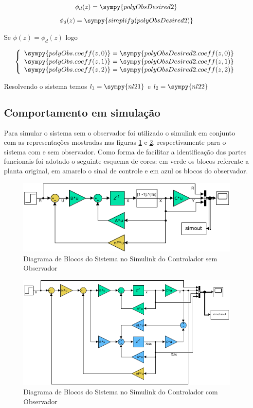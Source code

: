 \documentclass[a4paper,11pt]{article}
\begin{document}
$$\phi_d(z) = \sympy{polyObsDesired2}$$
$$\phi_d(z) = \sympy{simplify(polyObsDesired2)}$$

Se $\phi(z) = \phi_d(z)$ logo

$$
\left\{
    \begin{array}{l}
        \sympy{polyObs.coeff(z,0)} = \sympy{polyObsDesired2.coeff(z,0)}\\
        \sympy{polyObs.coeff(z,1)} = \sympy{polyObsDesired2.coeff(z,1)}\\
        \sympy{polyObs.coeff(z,2)} = \sympy{polyObsDesired2.coeff(z,2)}\\
    \end{array}
\right.
$$

Resolvendo o sistema temos $l_1 = \sympy{nl21} $ e $l_2 = \sympy{nl22}$

\subsection{Comportamento em simulação}

Para simular o sistema sem o observador foi utilizado o simulink em conjunto com as representações mostradas nas figuras \ref{fig:e6-ss-model} e \ref{fig:e6-ssobs-model}, respectivamente para o sistema com e sem observador. Como forma de facilitar a identificação das partes funcionais foi adotado o seguinte esquema de cores: em verde os blocos referente a planta original, em amarelo o sinal de controle e em azul os blocos do observador.

\begin{figure}[H]
    \centering
    \includegraphics[width=0.9\linewidth]{img/exsim6_ss_model.png}
    \caption{Diagrama de Blocos do Sistema no Simulink do Controlador sem Observador}
    \label{fig:e6-ss-model}
\end{figure}

\begin{figure}[H]
    \centering
    \includegraphics[width=0.9\linewidth]{img/exsim6_ss_observer_model.png}
    \caption{Diagrama de Blocos do Sistema no Simulink do Controlador com Observador}
    \label{fig:e6-ssobs-model}
\end{figure}
\end{document}

